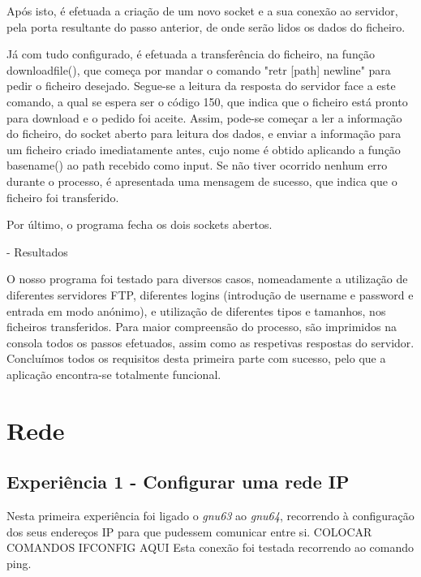 \documentclass[article, a4paper, 11pt, oneside]{memoir}
\begin{document}
Após isto, é efetuada a criação de um novo socket e a sua conexão ao servidor, pela porta resultante do passo anterior, de onde serão lidos os dados do ficheiro.

Já com tudo configurado, é efetuada a transferência do ficheiro, na função download\textunderscore file(), que começa por mandar
o comando "retr [path] newline" para pedir o ficheiro desejado. Segue-se a leitura da resposta do servidor face a este comando,
a qual se espera ser o código 150, que indica que o ficheiro está pronto para download e o pedido foi aceite. 
Assim, pode-se começar a ler a informação do ficheiro, do socket aberto para leitura dos dados, e enviar a informação para um ficheiro criado imediatamente antes,
cujo nome é obtido aplicando a função basename() ao path recebido como input. Se não tiver ocorrido nenhum erro durante o processo, é apresentada uma mensagem de sucesso,
que indica que o ficheiro foi transferido. 

Por último, o programa fecha os dois sockets abertos.

- Resultados

O nosso programa foi testado para diversos casos, nomeadamente a utilização de diferentes servidores FTP,
diferentes logins (introdução de username e password e entrada em modo anónimo), e utilização de diferentes tipos e tamanhos, nos ficheiros transferidos.
Para maior compreensão do processo, são imprimidos na consola todos os passos efetuados, assim como as respetivas respostas do servidor.
Concluímos todos os requisitos desta primeira parte com sucesso, pelo que a aplicação encontra-se totalmente funcional.

\chapter[Rede][Rede]{Rede} \label{\thechapter}

\section{Experiência 1 - Configurar uma rede IP}

Nesta primeira experiência foi ligado o \emph{gnu63} ao \emph{gnu64}, recorrendo à configuração dos seus endereços IP para que pudessem comunicar entre si. 
COLOCAR COMANDOS IFCONFIG AQUI
Esta conexão foi testada recorrendo ao comando ping.
\end{document}
